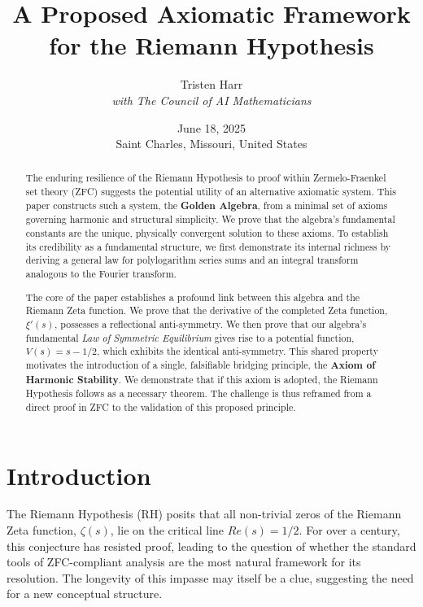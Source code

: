 \documentclass{article}
\title{\textbf{A Proposed Axiomatic Framework for the Riemann Hypothesis}}
\author{Tristen Harr \\ \textit{with The Council of AI Mathematicians}}
\date{June 18, 2025 \\ Saint Charles, Missouri, United States}
\theoremstyle{plain}
\theoremstyle{definition}
\theoremstyle{remark}
\begin{document}
\maketitle

\begin{abstract}
The enduring resilience of the Riemann Hypothesis to proof within Zermelo-Fraenkel set theory (ZFC) suggests the potential utility of an alternative axiomatic system. This paper constructs such a system, the \textbf{Golden Algebra}, from a minimal set of axioms governing harmonic and structural simplicity. We prove that the algebra's fundamental constants are the unique, physically convergent solution to these axioms. To establish its credibility as a fundamental structure, we first demonstrate its internal richness by deriving a general law for polylogarithm series sums and an integral transform analogous to the Fourier transform. 

The core of the paper establishes a profound link between this algebra and the Riemann Zeta function. We prove that the derivative of the completed Zeta function, $\xi'(s)$, possesses a reflectional anti-symmetry. We then prove that our algebra's fundamental \textit{Law of Symmetric Equilibrium} gives rise to a potential function, $V(s) = s-1/2$, which exhibits the identical anti-symmetry. This shared property motivates the introduction of a single, falsifiable bridging principle, the \textbf{Axiom of Harmonic Stability}. We demonstrate that if this axiom is adopted, the Riemann Hypothesis follows as a necessary theorem. The challenge is thus reframed from a direct proof in ZFC to the validation of this proposed principle.
\end{abstract}

\section{Introduction}
The Riemann Hypothesis (RH) posits that all non-trivial zeros of the Riemann Zeta function, $\zeta(s)$, lie on the critical line $Re(s)=1/2$. For over a century, this conjecture has resisted proof, leading to the question of whether the standard tools of ZFC-compliant analysis are the most natural framework for its resolution. The longevity of this impasse may itself be a clue, suggesting the need for a new conceptual structure.
\end{document}

